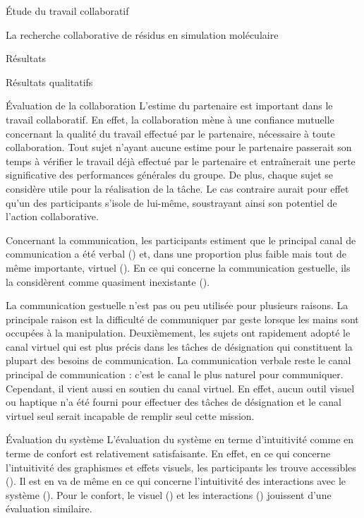 \documentclass[myfrancais]{mythesis}
\begin{document}
\begin{mypart}{Étude du travail collaboratif}
\begin{mychapter}{La recherche collaborative de résidus en simulation moléculaire}
\begin{mysection}{Résultats}
\begin{mysubsection}{Résultats qualitatifs}
\begin{mysubsubsection}{Évaluation de la collaboration}
						L'estime du partenaire est important dans le travail collaboratif.
						En effet, la collaboration mène à une confiance mutuelle concernant la qualité du travail effectué par le partenaire, nécessaire à toute collaboration.
						Tout sujet n'ayant aucune estime pour le partenaire passerait son temps à vérifier le travail déjà effectué par le partenaire et entraînerait une perte significative des performances générales du groupe.
						De plus, chaque sujet se considère utile pour la réalisation de la tâche.
						Le cas contraire aurait pour effet qu'un des participants s'isole de lui-même, soustrayant ainsi son potentiel de l'action collaborative.


						Concernant la communication, les participants estiment que le principal canal de communication a été verbal () et, dans une proportion plus faible mais tout de même importante, virtuel ().
						En ce qui concerne la communication gestuelle, ils la considèrent comme quasiment inexistante ().

						La communication gestuelle n'est pas ou peu utilisée pour plusieurs raisons.
						La principale raison est la difficulté de communiquer par geste lorsque les mains sont occupées à la manipulation.
						Deuxièmement, les sujets ont rapidement adopté le canal virtuel qui est plus précis dans les tâches de désignation qui constituent la plupart des besoins de communication.
						La communication verbale reste le canal principal de communication : c'est le canal le plus naturel pour communiquer.
						Cependant, il vient aussi en soutien du canal virtuel.
						En effet, aucun outil visuel ou haptique n'a été fourni pour effectuer des tâches de désignation et le canal virtuel seul serait incapable de remplir seul cette mission.
					\end{mysubsubsection}
					\begin{mysubsubsection}{Évaluation du système}
						L'évaluation du système en terme d'intuitivité comme en terme de confort est relativement satisfaisante.
						En effet, en ce qui concerne l'intuitivité des graphismes et effets visuels, les participants les trouve accessibles ().
						Il est en va de même en ce qui concerne l'intuitivité des interactions avec le système ().
						Pour le confort, le visuel () et les interactions () jouissent d'une évaluation similaire.


\end{mysubsubsection}
\end{mysubsection}
\end{mysection}
\end{mychapter}
\end{mypart}
\end{document}
